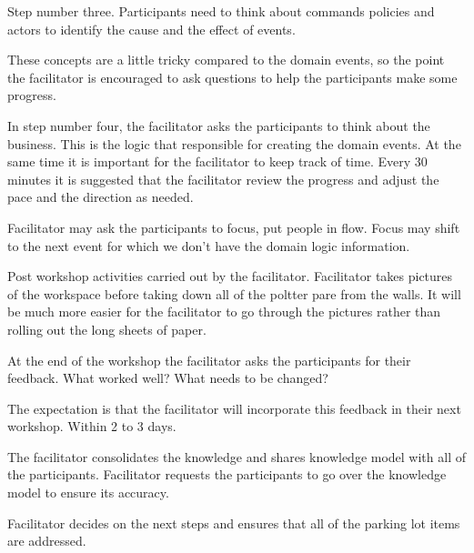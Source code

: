 Step number three.
Participants need to think about commands policies and actors to identify the cause and the effect of events.

These concepts are a little tricky compared to the domain events, so the point the facilitator is encouraged to ask questions to help the participants make some progress.

In step number four, the facilitator asks the participants to think about the business.
This is the logic that responsible for creating the domain events.
At the same time it is important for the facilitator to keep track of time.
Every 30 minutes it is suggested that the facilitator review the progress and adjust the pace and the direction as needed.

Facilitator may ask the participants to focus, put people in flow.
Focus may shift to the next event for which we don't have the domain logic information.

Post workshop activities carried out by the facilitator.
Facilitator takes pictures of the workspace before taking down all of the poltter pare from the walls.
It will be much more easier for the facilitator to go through the pictures rather than rolling out the long sheets of paper.

At the end of the workshop the facilitator asks the participants for their feedback.
What worked well?
What needs to be changed?

The expectation is that the facilitator will incorporate this feedback in their next workshop.
Within 2 to 3 days.

The facilitator consolidates the knowledge and shares knowledge model with all of the participants.
Facilitator requests the participants to go over the knowledge model to ensure its accuracy.

Facilitator decides on the next steps and ensures that all of the parking lot items are addressed.



